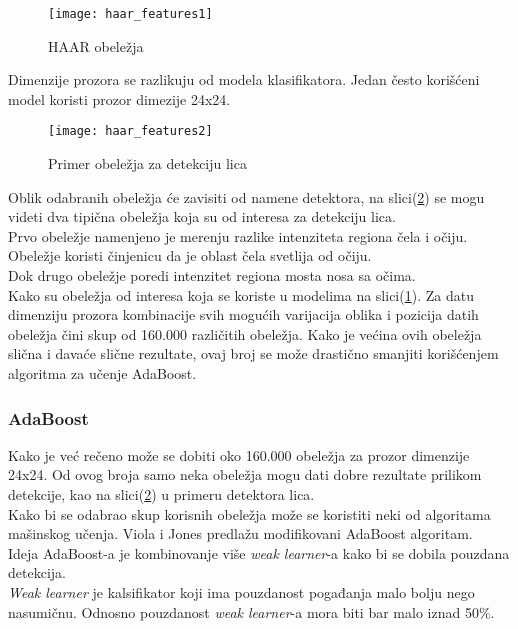 \begin{figure}[h]
  \centering
  \texttt{[image: haar\_features1]}
  \caption{HAAR obeležja \cite{Jensen2008ImplementingTV}}
  \label{haar_features_img1}
\end{figure}

Dimenzije prozora se razlikuju od modela klasifikatora. Jedan
često korišćeni model koristi prozor dimezije 24x24. \\

\begin{figure}[h]
  \centering
  \texttt{[image: haar\_features2]}
  \caption{Primer obeležja za detekciju lica \cite{Viola2001RapidOD}}
  \label{haar_features_img2}
\end{figure}

Oblik odabranih obeležja će zavisiti od namene detektora, na
slici(\ref{haar_features_img2}) se mogu videti dva tipična obeležja koja su od
interesa za detekciju lica. \\
Prvo obeležje namenjeno je merenju razlike
intenziteta regiona čela i očiju. Obeležje koristi činjenicu da je oblast čela
svetlija od očiju. \\
Dok drugo obeležje poredi intenzitet regiona mosta nosa sa očima. \\

Kako su obeležja od interesa koja se koriste u modelima na
slici(\ref{haar_features_img1}).
Za datu dimenziju prozora kombinacije svih mogućih varijacija oblika i pozicija
datih obeležja čini skup od 160.000 različitih obeležja.
Kako je većina ovih obeležja slična i davaće slične rezultate, ovaj broj se može
drastično smanjiti korišćenjem algoritma za učenje AdaBoost.

\subsubsection{AdaBoost}

Kako je već rečeno može se dobiti oko 160.000 obeležja za prozor dimenzije
24x24. Od ovog broja samo neka obeležja mogu dati dobre rezultate prilikom
detekcije, kao na slici(\ref{haar_features_img2}) u primeru detektora lica. \\

Kako bi se odabrao skup korisnih obeležja može se koristiti neki od algoritama
mašinskog učenja. Viola i Jones predlažu modifikovani AdaBoost algoritam. \\

Ideja AdaBoost-a je kombinovanje više \emph{weak learner}-a kako bi se dobila
pouzdana detekcija. \\
\emph{Weak learner} je kalsifikator koji ima pouzdanost pogađanja malo bolju
nego nasumičnu. Odnosno pouzdanost \emph{weak learner}-a mora biti bar malo
iznad 50\%. \\

